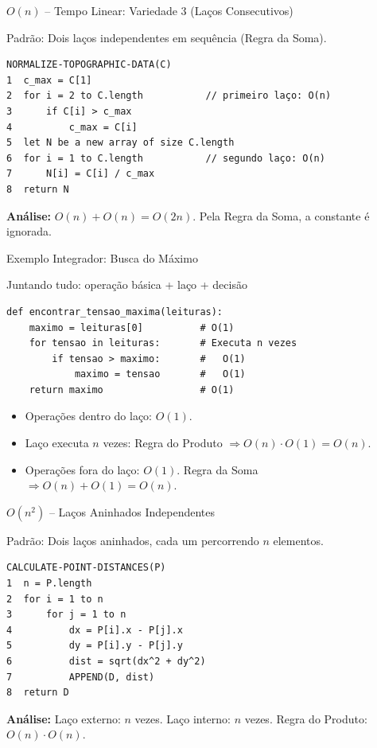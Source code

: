 \documentclass[aspectratio=169]{beamer}
\begin{document}
\begin{frame}{$O(n)$ -- Tempo Linear: Variedade 3 (Laços Consecutivos)}
    \begin{block}{Padrão: Dois laços independentes em sequência (Regra da Soma).}
    \end{block}
\begin{verbatim}
NORMALIZE-TOPOGRAPHIC-DATA(C)
1  c_max = C[1]
2  for i = 2 to C.length           // primeiro laço: O(n)
3      if C[i] > c_max
4          c_max = C[i]
5  let N be a new array of size C.length
6  for i = 1 to C.length           // segundo laço: O(n)
7      N[i] = C[i] / c_max
8  return N
\end{verbatim}
    \textbf{Análise:} $O(n) + O(n) = O(2n)$. Pela Regra da Soma, a constante é ignorada.
    
    \vspace{0.2cm}
    \hfill{}
\end{frame}

\begin{frame}{Exemplo Integrador: Busca do Máximo }
    \begin{block}{Juntando tudo: operação básica + laço + decisão}
    \end{block}
\begin{verbatim}
def encontrar_tensao_maxima(leituras):
    maximo = leituras[0]          # O(1)
    for tensao in leituras:       # Executa n vezes
        if tensao > maximo:       #   O(1)
            maximo = tensao       #   O(1)
    return maximo                 # O(1)
\end{verbatim}
    
    \begin{itemize}
        \item Operações dentro do laço: $O(1)$.
        \item Laço executa $n$ vezes: Regra do Produto $\Rightarrow O(n) \cdot O(1) = O(n)$.
        \item Operações fora do laço: $O(1)$. Regra da Soma $\Rightarrow O(n) + O(1) = O(n)$.
    \end{itemize}
    \hfill{}
\end{frame}

\begin{frame}{$O(n^2)$ -- Laços Aninhados Independentes}
    \begin{block}{Padrão: Dois laços aninhados, cada um percorrendo $n$ elementos.}
    \end{block}
\begin{verbatim}
CALCULATE-POINT-DISTANCES(P)
1  n = P.length
2  for i = 1 to n
3      for j = 1 to n
4          dx = P[i].x - P[j].x
5          dy = P[i].y - P[j].y
6          dist = sqrt(dx^2 + dy^2)
7          APPEND(D, dist)
8  return D
\end{verbatim}
    \textbf{Análise:} Laço externo: $n$ vezes. Laço interno: $n$ vezes. Regra do Produto: $O(n) \cdot O(n)$.
    
    \vspace{0.2cm}
    \hfill{}
\end{frame}
\end{document}
